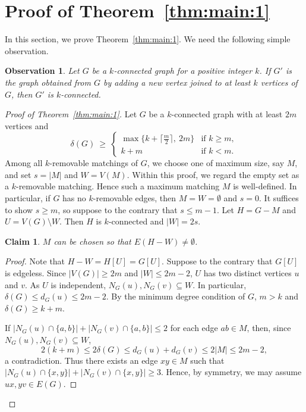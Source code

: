 \documentclass[11pt]{article}
\numberwithin{equation}{section}
\newtheorem{claim}[theorem]{Claim}
\newtheorem{observation}[theorem]{Observation}
\begin{document}
\section{Proof of Theorem~\ref{thm:main:1}}\label{sec:proof} 
In this section, we prove Theorem~\ref{thm:main:1}.
We need the following simple observation. 

\begin{observation}\label{lem:k_con_preserv}
Let $G$ be a $k$-connected graph for a positive integer $k$.
If $G'$ is the graph obtained from $G$ by adding a new vertex joined to at least $k$ vertices of $G$, then $G'$ is $k$-connected.
\end{observation}
 

\begin{proof}[Proof of Theorem~\ref{thm:main:1}]
Let $G$ be a $k$-connected graph with at least $2m$ vertices and \[
   \delta(G)\ \ge\
   \begin{cases}
      \max\bigl\{k+\bigl\lceil\tfrac m2\bigr\rceil,\ 2m\bigr\}
         & \text{if } k\ge m,\\[2pt]
      k+m & \text{if } k<m.
   \end{cases}
\]
Among all $k$-removable matchings of $G$, we choose one of maximum size, say $M$, and set $s=|M|$ and $W=V(M)$. Within this proof, we regard the empty set as a $k$-removable matching. Hence such a maximum matching $M$ is well-defined.
In particular, if $G$ has no $k$-removable edges, then $M=W=\emptyset$ and $s=0$. 
It suffices to show $s\ge m$, so suppose to the contrary that $s\le m-1$. 
Let $H=G-M$ and $U=V(G)\setminus W$. 
Then $H$ is $k$-connected and $|W|=2s$.

\begin{claim}\label{clm:good}
$M$ can be chosen so that $E(H-W)\neq\emptyset$.
\end{claim}


\begin{proof}
Note that $H-W=H[U]=G[U]$.
Suppose to the contrary that $G[U]$ is edgeless.
Since $|V(G)| \ge 2m$ and $|W|\le 2m-2$, $U$ has two distinct vertices $u$ and $v$.
As $U$ is independent, $N_G(u),N_G(v)\subseteq W$. 
In particular, $\delta(G) \le d_G(u) \le 2m-2$.
By the minimum degree condition of $G$, $m>k$ and $\delta(G)\ge k+m$. 

If $|N_G(u)\cap\{a,b\}|+|N_G(v)\cap \{a,b\}| \le 2$ for each edge $ab \in M$, then, since $N_G(u),N_G(v)\subseteq W$,
\[2(k+m)\le 2\delta(G)\le d_G(u)+d_G(v)\le 2|M| \le 2m-2,\]
a contradiction.
Thus there exists an edge $xy \in M$ such that $|N_G(u)\cap\{x,y\}|+|N_G(v)\cap \{x,y\}| \ge 3$.
Hence, by symmetry, we may assume $ux, yv \in E(G)$.



\end{proof}
\end{proof}
\end{document}
